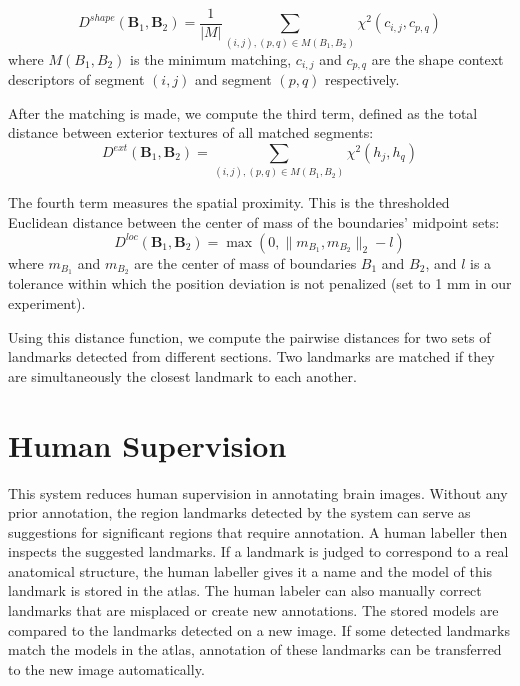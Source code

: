 \documentclass{llncs}
\begin{document}
$$D^{shape}(\mathbf{B}_1, \mathbf{B}_2) = \frac{1}{|M|}\sum_{(i,j), (p,q) \in M(B_1,B_2)} \chi^2(c_{i,j}, c_{p,q})$$ where $M(B_1,B_2)$ is the minimum matching, $c_{i,j}$ and $c_{p,q}$ are the shape context descriptors of segment $(i,j)$ and segment $(p,q)$ respectively.

After the matching is made, we compute the third term, defined as the total distance between exterior textures of all matched segments:
$$D^{ext}(\mathbf{B}_1, \mathbf{B}_2) = \sum_{(i,j), (p,q) \in M(B_1,B_2)} \chi^2(h_j, h_q)$$


The fourth term measures the spatial proximity. This is the thresholded Euclidean distance between the center of mass of the boundaries' midpoint sets:
$$D^{loc}(\mathbf{B}_1, \mathbf{B}_2) = \max(0, \| m_{B_1}, m_{B_2} \|_2 - l)$$
where $m_{B_1}$ and $m_{B_2}$ are the center of mass of boundaries $B_1$ and $B_2$, and $l$ is a tolerance within which the position deviation is not penalized (set to 1 mm in our experiment).



Using this distance function, we compute the pairwise distances for two sets of landmarks detected from different sections. Two landmarks are matched if they are simultaneously the closest landmark to each another.

\section{Human Supervision}

This system reduces human supervision in annotating brain images. Without any prior annotation, the region landmarks detected by the system can serve as suggestions for significant regions that require annotation. A human labeller then inspects the suggested landmarks. If a landmark is judged to correspond to a real anatomical structure, the human labeller gives it a name and the model of this landmark is stored in the atlas. The human labeler can also manually correct landmarks that are misplaced or create new annotations.
The stored models are compared to the landmarks detected on a new image. If some detected landmarks match the models in the atlas, annotation of these landmarks can be transferred to the new image automatically.
\end{document}
